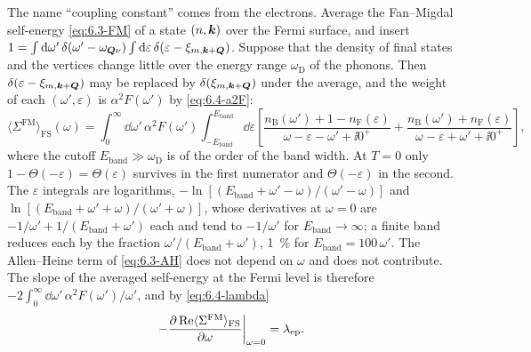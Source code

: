 The name ``coupling constant'' comes from the electrons. Average the Fan--Migdal self-energy \cref{eq:6.3-FM} of a state $(n,\bm{k})$ over the Fermi surface, and insert $1 = \int\mathrm{d}\omega'\,\delta(\omega' - \omega_{\bm{Q}\nu})\int\mathrm{d}\varepsilon\,\delta(\varepsilon - \xi_{m,\bm{k}+\bm{Q}})$. Suppose that the density of final states and the vertices change little over the energy range $\omega_{\mathrm{D}}$ of the phonons. Then $\delta(\varepsilon - \xi_{m,\bm{k}+\bm{Q}})$ may be replaced by $\delta(\xi_{m,\bm{k}+\bm{Q}})$ under the average, and the weight of each $(\omega',\varepsilon)$ is $\alpha^2F(\omega')$ by \cref{eq:6.4-a2F}:
\begin{equation*}
  \langle\Sigma^{\mathrm{FM}}\rangle_{\mathrm{FS}}(\omega) = \int_0^\infty\dd\omega'\,\alpha^2F(\omega')\int_{-E_{\mathrm{band}}}^{E_{\mathrm{band}}}\dd\varepsilon\left[\frac{n_{\mathrm{B}}(\omega') + 1 - n_{\mathrm{F}}(\varepsilon)}{\omega - \varepsilon - \omega' + \ii0^+} + \frac{n_{\mathrm{B}}(\omega') + n_{\mathrm{F}}(\varepsilon)}{\omega - \varepsilon + \omega' + \ii0^+}\right] ,
\end{equation*}
where the cutoff $E_{\mathrm{band}} \gg \omega_{\mathrm{D}}$ is of the order of the band width. At $T = 0$ only $1 - \Theta(-\varepsilon) = \Theta(\varepsilon)$ survives in the first numerator and $\Theta(-\varepsilon)$ in the second. The $\varepsilon$ integrals are logarithms, $-\ln[(E_{\mathrm{band}} + \omega' - \omega)/(\omega' - \omega)]$ and $\ln[(E_{\mathrm{band}} + \omega' + \omega)/(\omega' + \omega)]$, whose derivatives at $\omega = 0$ are $-1/\omega' + 1/(E_{\mathrm{band}} + \omega')$ each and tend to $-1/\omega'$ for $E_{\mathrm{band}} \to \infty$; a finite band reduces each by the fraction $\omega'/(E_{\mathrm{band}} + \omega')$, \SI{1}{\percent} for $E_{\mathrm{band}} = 100\,\omega'$. The Allen--Heine term of \cref{eq:6.3-AH} does not depend on $\omega$ and does not contribute. The slope of the averaged self-energy at the Fermi level is therefore $-2\int_0^\infty\dd\omega'\,\alpha^2F(\omega')/\omega'$, and by \cref{eq:6.4-lambda}
\begin{equation}
  -\frac{\partial\operatorname{Re}\langle\Sigma^{\mathrm{FM}}\rangle_{\mathrm{FS}}}{\partial\omega}\bigg|_{\omega=0} = \lambda_{\mathrm{ep}} .
  \label{eq:6.4-mass}
\end{equation}
